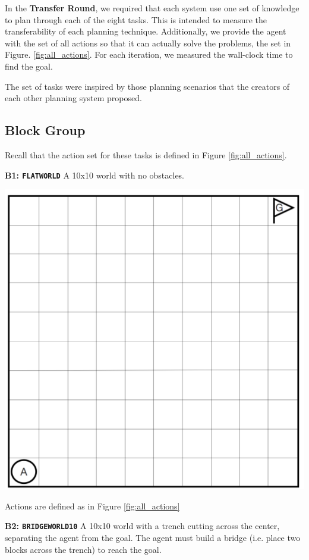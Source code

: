 \documentclass[]{article}
\begin{document}
In the {\bf Transfer Round}, we required that each system use one set of knowledge to plan through each of the eight tasks. This is intended to measure the transferability of each planning technique. Additionally, we provide the agent with the set of all actions so that it can actually solve the problems, the set in Figure. \ref{fig:all_actions}.
For each iteration, we measured the wall-clock time to find the goal.

The set of tasks were inspired by those planning scenarios that the creators of each other planning system proposed.
\subsection{Block Group}

Recall that the action set for these tasks is defined in Figure \ref{fig:all_actions}.

{\bf B1: \texttt{FLATWORLD}} A 10x10 world with no obstacles.

\begin{center}
\includegraphics[scale=0.24]{figures/flatland.png}
\end{center}

Actions are defined as in Figure \ref{fig:all_actions}
	
{\bf B2: \texttt{BRIDGEWORLD10}} A 10x10 world with a trench cutting across the center, separating the agent from the goal. The agent must build a bridge (i.e. place two blocks across the trench) to reach the goal.
\end{document}
